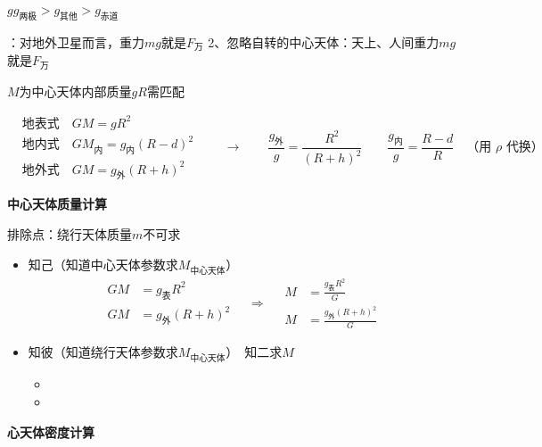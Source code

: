 $g$\quad $g_{\text{两极}}>g_{\text{其他}}>g_{\text{赤道}}$\hfill{}

：对地外卫星而言，重力$mg$就是$F_{\text{万}}$
2、忽略自转的中心天体：天上、人间重力$mg$就是$F_{\text{万}}$\quad{}%

$M$为中心天体内部质量\quad $gR$需匹配

\[
\begin{aligned}
&\text{地表式}\quad GM=gR^{2}\\
&\text{地内式}\quad GM_{\text{内}}=g_{\text{内}}(R-d)^{2}\\
&\text{地外式}\quad GM=g_{\text{外}}(R+h)^{2}
\end{aligned}
\qquad\to\qquad
\frac{g_{\text{外}}}{g}=\frac{R^{2}}{(R+h)^{2}}\quad\quad
\frac{g_{\text{内}}}{g}=\frac{R-d}{R}\quad\text{（用 $\rho$ 代换）}
\]

\textbf{中心天体质量计算}

排除点：绕行天体质量$m$不可求\quad{}%

\begin{itemize}
\item 知己（知道中心天体参数求$M_{\text{中心天体}}$）
\[
\begin{aligned}GM&=g_{\text{表}}R^{2}\\ GM&=g_{\text{外}}(R+h)^{2}\end{aligned}
\quad\Rightarrow\quad
\begin{aligned}M&=\frac{g_{\text{表}}R^{2}}{G}\\ M&=\frac{g_{\text{外}}(R+h)^{2}}{G}\end{aligned}
\]
\item 知彼（知道绕行天体参数求$M_{\text{中心天体}}$）\quad [$v$、$\omega/T$、$r$、$a$]\ 知二求$M$
  \begin{itemize}
  \item {}
  \item {}%
  \end{itemize}
\end{itemize}
\textbf{心天体密度计算}%

